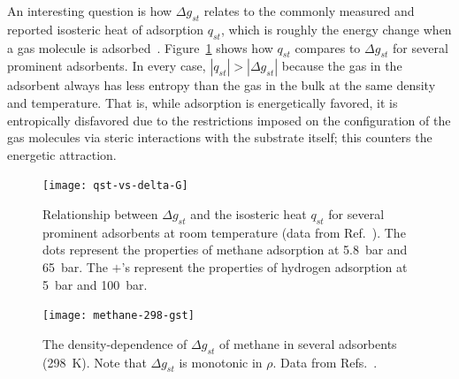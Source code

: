 \documentclass[twoside,twocolumn,9pt]{article}
\newcommand\gst{\ensuremath{\Delta g_{st}}}
\begin{document}
An interesting question is how $\gst$ relates to the commonly measured and
reported isosteric heat of adsorption $q_{st}$, which is roughly the energy
change when a gas molecule is adsorbed~\cite{sircar1999isosteric,
tian2017differential}. Figure~\ref{fig:qst-vs-delta-G} shows how $q_{st}$
compares to $\gst$ for several prominent adsorbents. In every case,
$|q_{st}|>|\gst|$ because the gas in the adsorbent always has less entropy than
the gas in the bulk at the same density and temperature. That is, while
adsorption is energetically favored, it is entropically disfavored due to the
restrictions imposed on the configuration of the gas molecules via steric
interactions with the substrate itself; this counters the energetic attraction.

\begin{figure}
    \centering
    \texttt{[image: qst-vs-delta-G]}
    \caption{Relationship between $\gst$ and the isosteric heat
      $q_{st}$ for several prominent adsorbents at room
      temperature (data from Ref.~\cite{mason2014evaluating, garcia2018benchmark}). The dots represent the properties of methane
      adsorption at 5.8~bar and 65~bar. The $+$'s represent the
      properties of hydrogen adsorption at 5~bar and
      100~bar.}
    \label{fig:qst-vs-delta-G}
\end{figure}

\begin{figure}
    \centering
    \texttt{[image: methane-298-gst]}
    \caption{The density-dependence of $\gst$ of methane in several
      adsorbents (298\ K). Note that $\gst$ is monotonic in
      $\rho$. Data from
      Refs.~\cite{mason2014evaluating, furukawa2009storage}.
    }
    \label{fig:methane-gst}
\end{figure}
\end{document}
